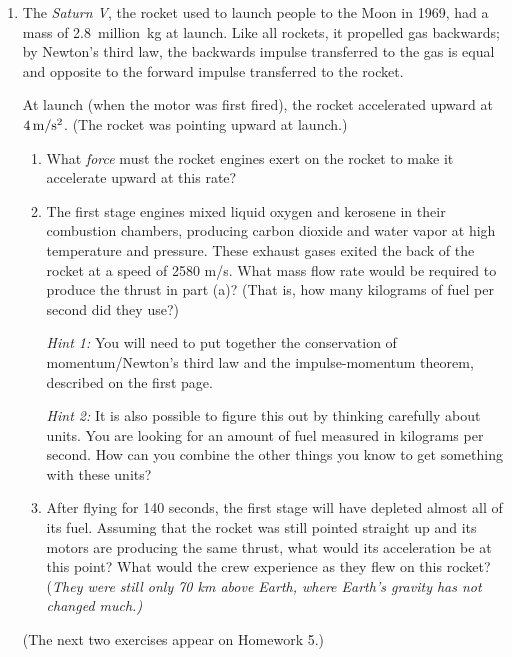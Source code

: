 \documentclass[12pt]{article}
\begin{document}
\begin{enumerate}

	\item The {\it Saturn V}, the rocket used to launch people to the Moon in 1969, had a mass of 2.8~million~kg at launch. Like all rockets, it propelled gas backwards; by Newton's third law, the backwards impulse transferred to the gas is equal and opposite to the forward impulse transferred to the rocket. 

		At launch (when the motor was first fired), the rocket accelerated upward at $4 \, \rm m/\rm s^2$. (The rocket was pointing upward at launch.)

		\begin{enumerate}
			\item What {\it force} must the rocket engines exert on the rocket to make it accelerate upward at this rate?
			
\newpage
			
			\item {The first stage engines mixed liquid oxygen and kerosene in their combustion chambers, producing carbon dioxide and water vapor at high temperature and pressure. These exhaust gases exited the back
				of the rocket at a speed of 2580 m/s. What mass flow rate would be required to produce the thrust in part (a)? (That is, how many kilograms of fuel per second did they use?)

				{\it Hint 1:} You will need to put together the conservation of momentum/Newton's third law and the impulse-momentum theorem, described on the first page.

				{\it Hint 2:} It is also possible to figure this out by thinking carefully about units. You are looking for an amount of fuel measured in kilograms per second. How can you combine the other things you know to get something with these units?
\vspace{3in}
				}
			\item After flying for 140 seconds, the first stage will have depleted almost all of its fuel. Assuming that the rocket was still pointed straight up and its motors are producing the same thrust, what would its acceleration be at this point? What would the crew experience as they flew on this rocket? {(\it They were still only 70 km above Earth, where Earth's gravity has not changed much.)}
		\end{enumerate}

\newpage

		{\it \begin{center} (The next two exercises appear on Homework 5.) \end{center}}
		

\end{enumerate}
\end{document}
